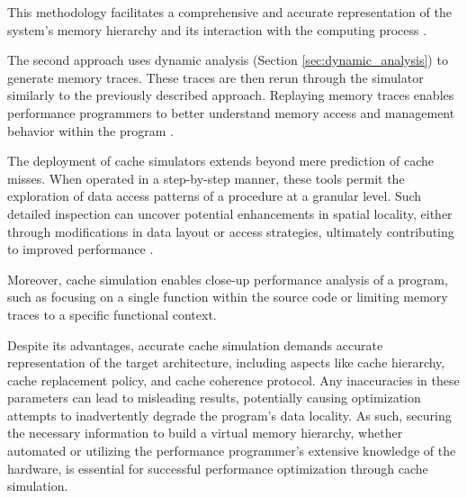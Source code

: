 This methodology facilitates a comprehensive and accurate representation of the system's memory hierarchy and its interaction with the computing process \cite{schaad2022boosting,hammer2017kerncraft}.

The second approach uses dynamic analysis (Section \ref{sec:dynamic_analysis}) to generate memory traces. These traces are then rerun through the simulator similarly to the previously described approach. Replaying memory traces enables performance programmers to better understand memory access and management behavior within the program \cite{choudhury2011abstract}.

The deployment of cache simulators extends beyond mere prediction of cache misses. When operated in a step-by-step manner, these tools permit the exploration of data access patterns of a procedure at a granular level. Such detailed inspection can uncover potential enhancements in spatial locality, either through modifications in data layout or access strategies, ultimately contributing to improved performance \cite{schaad2022boosting,hammer2017kerncraft,choudhury2011abstract}.

Moreover, cache simulation enables close-up performance analysis of a program, such as focusing on a single function within the source code or limiting memory traces to a specific functional context.

Despite its advantages, accurate cache simulation demands accurate representation of the target architecture, including aspects like cache hierarchy, cache replacement policy, and cache coherence protocol. Any inaccuracies in these parameters can lead to misleading results, potentially causing optimization attempts to inadvertently degrade the program's data locality. As such, securing the necessary information to build a virtual memory hierarchy, whether automated or utilizing the performance programmer's extensive knowledge of the hardware, is essential for successful performance optimization through cache simulation.

